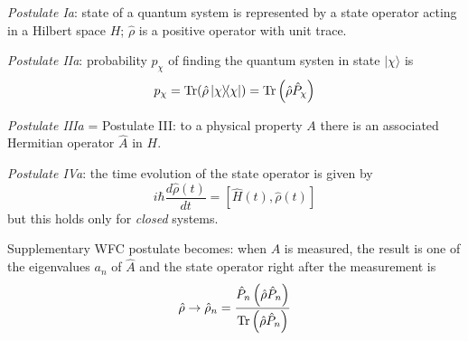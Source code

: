 \documentclass[12pt]{article}
\newcommand{\be}{\begin{equation}}
\newcommand{\ee}{\end{equation}}
\begin{document}
\emph{Postulate Ia}: state of a quantum system is represented
by a state operator acting in a Hilbert space $H$;
\(\hat{\rho}\) is a positive operator with unit trace.


\emph{Postulate IIa}: probability $p_{\chi}$ of finding the quantum
systen in state $|\chi\rangle$ is 
\be
p_{\chi}=\Tr(\hat{\rho}\op{\chi})=\Tr\left(\hat{\rho} \hat{P}_{\chi}\right)
\ee


\emph{Postulate IIIa} =  Postulate III: to a physical property
$A$ there is an associated Hermitian operator \(\hat{A}\)
in $H$.

\emph{Postulate IVa}: the time evolution of the state operator
is given by
\be
i\hbar \frac{d \hat{\rho}(t)}{d t}=[\hat{H}(t), \hat{\rho}(t)]
\ee
but this holds only for \emph{closed} systems.

Supplementary WFC postulate becomes: when \(A\) is
measured, the result is one of the eigenvalues $a_n$ of \(\hat{A}\)
and the state operator right after the measurement is
\be
\hat{\rho} \rightarrow \hat{\rho}_{n}=
\frac{\hat{P}_{n}\left(\hat{\rho} \hat{P}_{n}\right)}
{\Tr\left(\hat{\rho} \hat{P}_{n}\right)}
\ee
\end{document}

